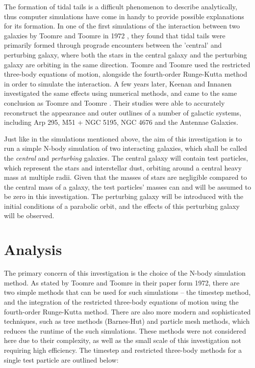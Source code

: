 \documentclass[twoside,twocolumn]{article}
\begin{document}
    The formation of tidal tails is a difficult phenomenon to describe analytically, thus computer simulations have come in handy to provide possible explanations for its formation. In one of the first simulations of the interaction between two galaxies by Toomre and Toomre in 1972 \cite{toomre}, they found that tidal tails were primarily formed through prograde encounters between the 'central' and perturbing galaxy, where both the stars in the central galaxy and the perturbing galaxy are orbiting in the same direction. Toomre and Toomre used the restricted three-body equations of motion, alongside the fourth-order Runge-Kutta method in order to simulate the interaction. A few years later, Keenan and Innanen investigated the same effects using numerical methods, and came to the same conclusion as Toomre and Toomre \cite{keenan}. Their studies were able to accurately reconstruct the appearance and outer outlines of a number of galactic systems, including Arp 295, M51 + NGC 5195, NGC 4676 and the Antennae Galaxies.

    Just like in the simulations mentioned above, the aim of this investigation is to run a simple N-body simulation of two interacting galaxies, which shall be called the \emph{central} and \emph{perturbing} galaxies. The central galaxy will contain test particles, which represent the stars and interstellar dust, orbiting around a central heavy mass at multiple radii. Given that the masses of stars are negligible compared to the central mass of a galaxy, the test particles' masses can and will be assumed to be zero in this investigation. The perturbing galaxy will be introduced with the initial conditions of a parabolic orbit, and the effects of this perturbing galaxy will be observed.


\section{Analysis}    

    The primary concern of this investigation is the choice of the N-body simulation method. As stated by Toomre and Toomre in their paper form 1972, there are two simple methods that can be used for such simulations -- the timestep method, and the integration of the restricted three-body equations of motion using the fourth-order Runge-Kutta method. There are also more modern and sophisticated techniques, such as tree methods (Barnes-Hut) and particle mesh methods, which reduces the runtime of the such simulations. These methods were not considered here due to their complexity, as well as the small scale of this investigation not requiring high efficiency. The timestep and restricted three-body methods for a single test particle are outlined below:
    \vspace{0.2cm}
\end{document}
